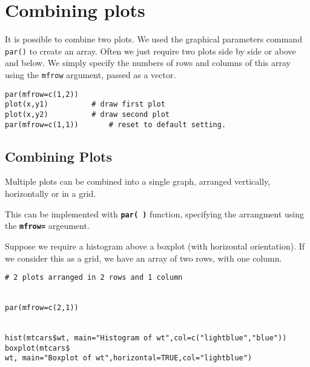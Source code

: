 \documentclass[a4paper,12pt]{article}
\begin{document}
\section*{Combining plots}
It is possible to combine two plots. We used the graphical parameters command \texttt{par()} to create an array. 
Often we just require two plots side by side or above and below. We simply specify the numbers of rows and columns of this array using the \texttt{mfrow} argument, passed as a vector.

\begin{verbatim}
par(mfrow=c(1,2))
plot(x,y1)			# draw first plot
plot(x,y2)			# draw second plot
par(mfrow=c(1,1))		# reset to default setting.
\end{verbatim}

\subsection*{Combining Plots}
Multiple plots can be combined into a single graph, arranged vertically, horizontally or in a grid.

This can be implemented with \texttt{\textbf{par( )}} function, specifying the arrangment using the \texttt{\textbf{mfrow=}} argeument.

Suppose we require a histogram above a boxplot (with horizontal orientation). If we consider this as a grid, we have an array of two rows, with one column.

\begin{framed}
\begin{verbatim}
# 2 plots arranged in 2 rows and 1 column


par(mfrow=c(2,1))


hist(mtcars$wt, main="Histogram of wt",col=c("lightblue","blue"))
boxplot(mtcars$
wt, main="Boxplot of wt",horizontal=TRUE,col="lightblue")

\end{verbatim}
\end{framed}

\end{document}

